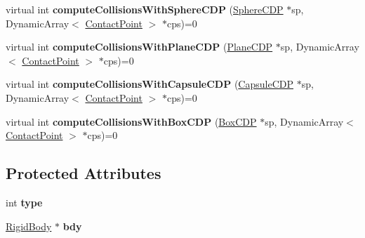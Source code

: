 \begin{DoxyCompactItemize}
\item 
\hypertarget{classCartWheel_1_1Physics_1_1CollisionDetectionPrimitive_acf3b92498d8328875837093cae380031}{
virtual int {\bfseries computeCollisionsWithSphereCDP} (\hyperlink{classCartWheel_1_1Physics_1_1SphereCDP}{SphereCDP} $\ast$sp, DynamicArray$<$ \hyperlink{classCartWheel_1_1Physics_1_1ContactPoint}{ContactPoint} $>$ $\ast$cps)=0}
\label{classCartWheel_1_1Physics_1_1CollisionDetectionPrimitive_acf3b92498d8328875837093cae380031}

\item 
\hypertarget{classCartWheel_1_1Physics_1_1CollisionDetectionPrimitive_a944721036f923d2e9e60001971460139}{
virtual int {\bfseries computeCollisionsWithPlaneCDP} (\hyperlink{classCartWheel_1_1Physics_1_1PlaneCDP}{PlaneCDP} $\ast$sp, DynamicArray$<$ \hyperlink{classCartWheel_1_1Physics_1_1ContactPoint}{ContactPoint} $>$ $\ast$cps)=0}
\label{classCartWheel_1_1Physics_1_1CollisionDetectionPrimitive_a944721036f923d2e9e60001971460139}

\item 
\hypertarget{classCartWheel_1_1Physics_1_1CollisionDetectionPrimitive_a90dd081f7e7fe104c3abceb0bf55595c}{
virtual int {\bfseries computeCollisionsWithCapsuleCDP} (\hyperlink{classCartWheel_1_1Physics_1_1CapsuleCDP}{CapsuleCDP} $\ast$sp, DynamicArray$<$ \hyperlink{classCartWheel_1_1Physics_1_1ContactPoint}{ContactPoint} $>$ $\ast$cps)=0}
\label{classCartWheel_1_1Physics_1_1CollisionDetectionPrimitive_a90dd081f7e7fe104c3abceb0bf55595c}

\item 
\hypertarget{classCartWheel_1_1Physics_1_1CollisionDetectionPrimitive_ae11a147db0dfc3ac9980f9799c48a520}{
virtual int {\bfseries computeCollisionsWithBoxCDP} (\hyperlink{classCartWheel_1_1Physics_1_1BoxCDP}{BoxCDP} $\ast$sp, DynamicArray$<$ \hyperlink{classCartWheel_1_1Physics_1_1ContactPoint}{ContactPoint} $>$ $\ast$cps)=0}
\label{classCartWheel_1_1Physics_1_1CollisionDetectionPrimitive_ae11a147db0dfc3ac9980f9799c48a520}

\end{DoxyCompactItemize}
\subsection*{Protected Attributes}
\begin{DoxyCompactItemize}
\item 
\hypertarget{classCartWheel_1_1Physics_1_1CollisionDetectionPrimitive_a2e3ffc91ec388fbbe42a330c8f7fab28}{
int {\bfseries type}}
\label{classCartWheel_1_1Physics_1_1CollisionDetectionPrimitive_a2e3ffc91ec388fbbe42a330c8f7fab28}

\item 
\hypertarget{classCartWheel_1_1Physics_1_1CollisionDetectionPrimitive_a73b383dd9795d382aa1d423936cfa1b3}{
\hyperlink{classCartWheel_1_1Physics_1_1RigidBody}{RigidBody} $\ast$ {\bfseries bdy}}
\label{classCartWheel_1_1Physics_1_1CollisionDetectionPrimitive_a73b383dd9795d382aa1d423936cfa1b3}

\end{DoxyCompactItemize}


